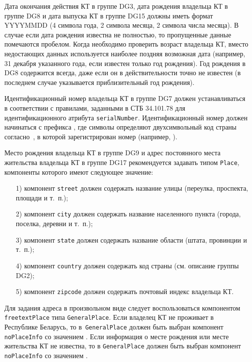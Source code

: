 Дата окончания действия КТ в группе DG3, дата рождения владельца КТ в группе DG8 
и дата выпуска КТ в группе DG15 должны иметь формат YYYYMMDD 
(4 символа года, 2 символа месяца, 2 символа 
числа месяца). В случае если дата рождения известна не полностью, то 
пропущенные данные помечаются пробелом. Когда необходимо проверить 
возраст владельца КТ, вместо недостающих данных используется наиболее 
поздняя возможная дата (например, 31 декабря указанного года, если 
известен только год рождения). Год рождения в DG8 содержится всегда, даже 
если он в действительности точно не известен (в последнем случае 
указывается приблизительный год рождения). 

Идентификационный номер владельца КТ в группе DG7 должен устанавливаться в соответствии с
правилами, заданными в СТБ 34.101.78 для идентификационного атрибута
\verb|serialNumber|. Идентификационный номер должен начинаться с префикса
, где символы  определяют двухсимвольный код страны
согласно~\cite{CountryCodes}, в которой зарегистрирован номер
(например, ).

Место рождения владельца КТ в группе DG9 и адрес постоянного места жительства
владельца КТ в группе DG17 рекомендуется задавать типом \verb|Place|, 
компоненты которого имеют следующее значение: 
\begin{enumerate}
\item[1)]
компонент \verb|street| должен содержать название улицы (переулка, 
проспекта, площади и т.~п.); 
\item[2)]
компонент \verb|city| должен содержать название населенного пункта (города, 
поселка, деревни и т.~п.); 
\item[3)]
компонент \verb|state| должен содержать название области (штата, провинции и т.~п.);
\item[4)]
компонент \verb|country| должен содержать код страны (см. описание группы DG2);
\item[5)]
компонент \verb|zipcode| должен содержать почтовый индекс владельца КТ.
\end{enumerate}

Для задания адреса в произвольном виде следует воспользоваться компонентом 
\verb|freetextPlace| типа \verb|GeneralPlace|. Если владелец КТ не проживает в 
Республике Беларусь, то в~\verb|GeneralPlace| должен быть выбран компонент 
\verb|noPlaceInfo| со значением . 
Если информация о месте рождения или месте жительства 
КТ не известна, то в \verb|GeneralPlace| 
должен быть выбран компонент \verb|noPlaceInfo| со значением 
. 

